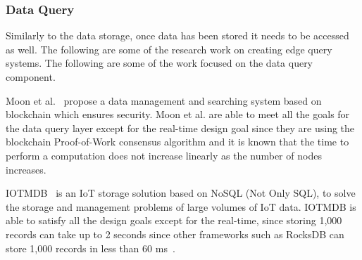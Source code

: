 \subsubsection{Data Query}

Similarly to the data storage, once data has been stored it needs to be accessed as well. The following are some of the research work on creating edge query systems. The following are some of the work focused on the data query component.
 
Moon et al.~\cite{8190803} propose a data management and searching system based on blockchain which ensures security. Moon et al. are able to meet all the goals for the data query layer except for the real-time design goal since they are using the blockchain Proof-of-Work consensus algorithm and it is known that the time to perform a computation does not increase linearly as the number of nodes increases.

IOTMDB~\cite{6468294} is an IoT storage solution based on NoSQL (Not Only SQL), to solve the storage and management problems of large volumes of IoT data. IOTMDB is able to satisfy all the design goals except for the real-time, since storing 1,000 records can take up to 2 seconds since other frameworks such as RocksDB can store 1,000 records in less than 60 ms~\cite{8778344}.


